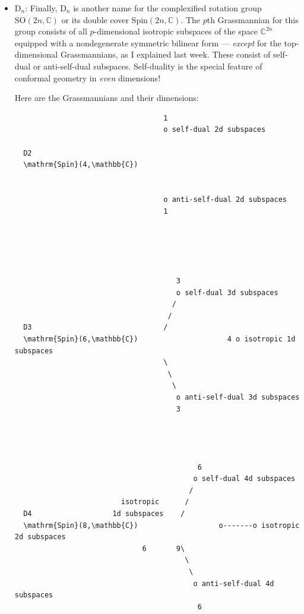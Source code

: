 \documentclass{article}
\begin{document}
\begin{itemize}
\begin{verbatim}
                             irreducible     irreducible    irreducible
  C4              vectors     bivectors       3-vectors      4-vectors
  \mathrm{Sp}(8,\mathbb{C})          o-------------o---------------o=======<======o
                   8            27              48             42
\end{verbatim}

  Maybe someone can tell if they're right.
\item
  \(\mathrm{D}_n\): Finally, \(\mathrm{D}_n\) is another name for the
  complexified rotation group \(\mathrm{SO}(2n,\mathbb{C})\) or its
  double cover \(\mathrm{Spin}(2n,\mathbb{C})\). The \(p\)th
  Grassmannian for this group consists of all \(p\)-dimensional
  isotropic subspaces of the space \(\mathbb{C}^{2n}\) equipped with a
  nondegenerate symmetric bilinear form --- \emph{except} for the
  top-dimensional Grassmannians, as I explained last week. These consist
  of self-dual or anti-self-dual subspaces. Self-duality is the special
  feature of conformal geometry in \emph{even} dimensions!

  Here are the Grassmannians and their dimensions:

\begin{verbatim}
                                   1
                                   o self-dual 2d subspaces

  D2                                      
  \mathrm{Spin}(4,\mathbb{C})                 


                                   o anti-self-dual 2d subspaces
                                   1





                                      3
                                      o self-dual 3d subspaces
                                     /
                                    /
  D3                               /
  \mathrm{Spin}(6,\mathbb{C})                     4 o isotropic 1d subspaces
                                   \
                                    \
                                     \
                                      o anti-self-dual 3d subspaces
                                      3




                                           6
                                          o self-dual 4d subspaces
                                         /
                         isotropic      /
  D4                   1d subspaces    /
  \mathrm{Spin}(8,\mathbb{C})                   o-------o isotropic 2d subspaces 
                              6       9\
                                        \
                                         \
                                          o anti-self-dual 4d subspaces
                                           6





\end{verbatim}
\end{itemize}
\end{document}
